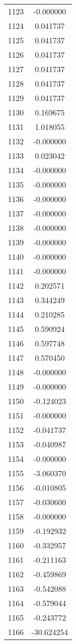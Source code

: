 \documentclass[12pt]{article}
\begin{document}
\begin{longtable}{@{}cc@{}}
1123 & -0.000000 \\
1124 & 0.041737 \\
1125 & 0.041737 \\
1126 & 0.041737 \\
1127 & 0.041737 \\
1128 & 0.041737 \\
1129 & 0.041737 \\
1130 & 0.169675 \\
1131 & 1.018055 \\
1132 & -0.000000 \\
1133 & 0.023042 \\
1134 & -0.000000 \\
1135 & -0.000000 \\
1136 & -0.000000 \\
1137 & -0.000000 \\
1138 & -0.000000 \\
1139 & -0.000000 \\
1140 & -0.000000 \\
1141 & -0.000000 \\
1142 & 0.202571 \\
1143 & 0.344249 \\
1144 & 0.210285 \\
1145 & 0.590924 \\
1146 & 0.597748 \\
1147 & 0.570450 \\
1148 & -0.000000 \\
1149 & -0.000000 \\
1150 & -0.124023 \\
1151 & -0.000000 \\
1152 & -0.041737 \\
1153 & -0.040987 \\
1154 & -0.000000 \\
1155 & -3.060370 \\
1156 & -0.010805 \\
1157 & -0.030600 \\
1158 & -0.000000 \\
1159 & -0.192932 \\
1160 & -0.332957 \\
1161 & -0.211163 \\
1162 & -0.459869 \\
1163 & -0.542088 \\
1164 & -0.579044 \\
1165 & -0.243772 \\
1166 & -30.624254 \\

\end{longtable}
\end{document}
